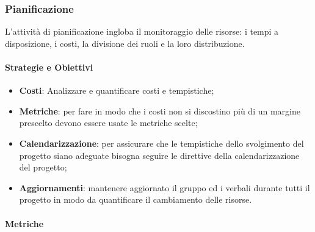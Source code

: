             \hphantom{}
            \def\productquality{
            {   Percentuale dei requisiti soddisfatti,
                $ \frac{ReqSoddisfatti}{ReqTotali}$, 
                $ 100 \% $,
                $ 100 \% $
            },
        }
        
            
        \newpage    
        \subsubsection{Pianificazione}
        L'attività di pianificazione ingloba il monitoraggio delle risorse: i tempi a disposizione, i costi, la divisione dei ruoli e la loro distribuzione.
            \paragraph{Strategie e Obiettivi}
                \begin{itemize}
                    \item \textbf{Costi}: Analizzare e quantificare costi e tempistiche;
                    \item \textbf{Metriche}: per fare in modo che i costi non si discostino più di un margine prescelto devono essere usate le metriche scelte;
                    \item \textbf{Calendarizzazione}: per assicurare che le tempistiche dello svolgimento del progetto siano adeguate bisogna seguire le direttive della calendarizzazione del progetto;
                    \item \textbf{Aggiornamenti}: mantenere aggiornato il gruppo ed i verbali durante tutti il progetto in modo da quantificare il cambiamento delle risorse.
                \end{itemize}
                
           \paragraph{Metriche}
            
            \hphantom{}
            \def\productquality{
            {   Budget at Completion [BG],
                numero intero, 
                $ \pm 5 \% $ del preventivo,
                pari al preventivo
            },
            {   Earned value [EV],
                BAC - $\%$ di lavoro completato, 
                $ >0$,
                $ >0$
            },
            {   Planned value [PV],
                valore pianificato nel momento del calcolo, 
                $ >0$,
                $ >0$
            },
            {  Acual cost [AC],
               numero intero, 
                0 < AC $\leq$ budget totale,
                0 < AC $\leq$ PV
            },
            {   Schedule variance [SV],
               SV = EV - PV, 
                $ >0$,
                $ 0$
            },
            {    Cost variance [CV],
               CV = EV - AC, 
                $ >0$,
                $ \geq 0$
            },
        }
        

